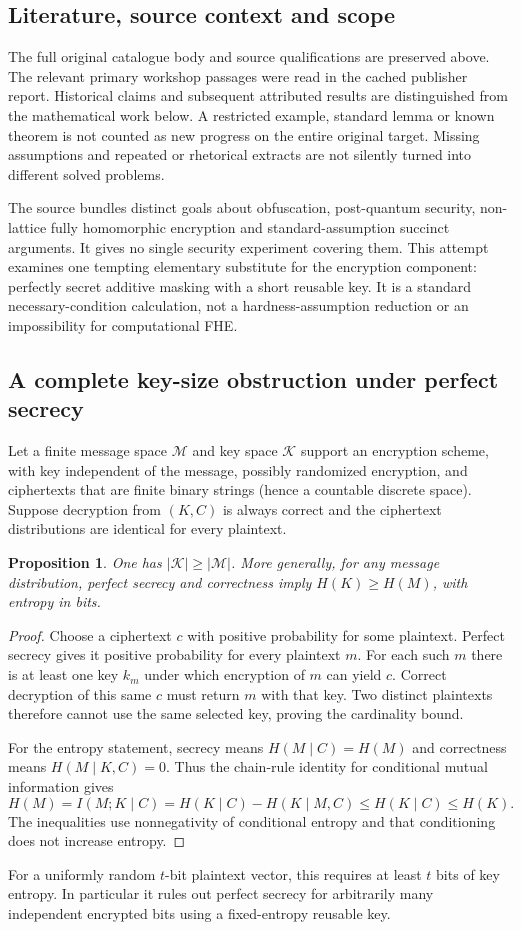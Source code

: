 \documentclass[11pt]{article}
\newtheorem{proposition}{Proposition}
\begin{document}
\subsection{Literature, source context and scope}
The full original catalogue body and source qualifications are preserved above. The relevant primary workshop passages were read in the cached publisher report. Historical claims and subsequent attributed results are distinguished from the mathematical work below. A restricted example, standard lemma or known theorem is not counted as new progress on the entire original target. Missing assumptions and repeated or rhetorical extracts are not silently turned into different solved problems.

The source bundles distinct goals about obfuscation, post-quantum security, non-lattice fully homomorphic encryption and standard-assumption succinct arguments. It gives no single security experiment covering them. This attempt examines one tempting elementary substitute for the encryption component: perfectly secret additive masking with a short reusable key. It is a standard necessary-condition calculation, not a hardness-assumption reduction or an impossibility for computational FHE.
\subsection{A complete key-size obstruction under perfect secrecy}
Let a finite message space $\mathcal M$ and key space $\mathcal K$ support an encryption scheme, with key independent of the message, possibly randomized encryption, and ciphertexts that are finite binary strings (hence a countable discrete space). Suppose decryption from $(K,C)$ is always correct and the ciphertext distributions are identical for every plaintext.
\begin{proposition}
One has $|\mathcal K|\ge|\mathcal M|$. More generally, for any message distribution, perfect secrecy and correctness imply $H(K)\ge H(M)$, with entropy in bits.
\end{proposition}
\begin{proof}
Choose a ciphertext $c$ with positive probability for some plaintext. Perfect secrecy gives it positive probability for every plaintext $m$. For each such $m$ there is at least one key $k_m$ under which encryption of $m$ can yield $c$. Correct decryption of this same $c$ must return $m$ with that key. Two distinct plaintexts therefore cannot use the same selected key, proving the cardinality bound.

For the entropy statement, secrecy means $H(M\mid C)=H(M)$ and correctness means $H(M\mid K,C)=0$. Thus the chain-rule identity for conditional mutual information gives
\[
 H(M)=I(M;K\mid C)=H(K\mid C)-H(K\mid M,C)\le H(K\mid C)\le H(K).
\]
The inequalities use nonnegativity of conditional entropy and that conditioning does not increase entropy.
\end{proof}
For a uniformly random $t$-bit plaintext vector, this requires at least $t$ bits of key entropy. In particular it rules out perfect secrecy for arbitrarily many independent encrypted bits using a fixed-entropy reusable key.
\end{document}
